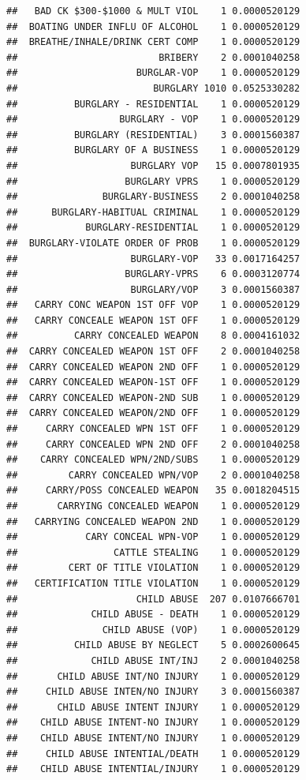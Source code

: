 \documentclass[]{book}
\begin{document}
\begin{verbatim}
##   BAD CK $300-$1000 & MULT VIOL    1 0.0000520129
##  BOATING UNDER INFLU OF ALCOHOL    1 0.0000520129
##  BREATHE/INHALE/DRINK CERT COMP    1 0.0000520129
##                         BRIBERY    2 0.0001040258
##                     BURGLAR-VOP    1 0.0000520129
##                        BURGLARY 1010 0.0525330282
##          BURGLARY - RESIDENTIAL    1 0.0000520129
##                  BURGLARY - VOP    1 0.0000520129
##          BURGLARY (RESIDENTIAL)    3 0.0001560387
##          BURGLARY OF A BUSINESS    1 0.0000520129
##                    BURGLARY VOP   15 0.0007801935
##                   BURGLARY VPRS    1 0.0000520129
##               BURGLARY-BUSINESS    2 0.0001040258
##      BURGLARY-HABITUAL CRIMINAL    1 0.0000520129
##            BURGLARY-RESIDENTIAL    1 0.0000520129
##  BURGLARY-VIOLATE ORDER OF PROB    1 0.0000520129
##                    BURGLARY-VOP   33 0.0017164257
##                   BURGLARY-VPRS    6 0.0003120774
##                    BURGLARY/VOP    3 0.0001560387
##   CARRY CONC WEAPON 1ST OFF VOP    1 0.0000520129
##   CARRY CONCEALE WEAPON 1ST OFF    1 0.0000520129
##          CARRY CONCEALED WEAPON    8 0.0004161032
##  CARRY CONCEALED WEAPON 1ST OFF    2 0.0001040258
##  CARRY CONCEALED WEAPON 2ND OFF    1 0.0000520129
##  CARRY CONCEALED WEAPON-1ST OFF    1 0.0000520129
##  CARRY CONCEALED WEAPON-2ND SUB    1 0.0000520129
##  CARRY CONCEALED WEAPON/2ND OFF    1 0.0000520129
##     CARRY CONCEALED WPN 1ST OFF    1 0.0000520129
##     CARRY CONCEALED WPN 2ND OFF    2 0.0001040258
##    CARRY CONCEALED WPN/2ND/SUBS    1 0.0000520129
##         CARRY CONCEALED WPN/VOP    2 0.0001040258
##     CARRY/POSS CONCEALED WEAPON   35 0.0018204515
##       CARRYING CONCEALED WEAPON    1 0.0000520129
##   CARRYING CONCEALED WEAPON 2ND    1 0.0000520129
##            CARY CONCEAL WPN-VOP    1 0.0000520129
##                 CATTLE STEALING    1 0.0000520129
##         CERT OF TITLE VIOLATION    1 0.0000520129
##   CERTIFICATION TITLE VIOLATION    1 0.0000520129
##                     CHILD ABUSE  207 0.0107666701
##             CHILD ABUSE - DEATH    1 0.0000520129
##               CHILD ABUSE (VOP)    1 0.0000520129
##          CHILD ABUSE BY NEGLECT    5 0.0002600645
##             CHILD ABUSE INT/INJ    2 0.0001040258
##       CHILD ABUSE INT/NO INJURY    1 0.0000520129
##     CHILD ABUSE INTEN/NO INJURY    3 0.0001560387
##       CHILD ABUSE INTENT INJURY    1 0.0000520129
##    CHILD ABUSE INTENT-NO INJURY    1 0.0000520129
##    CHILD ABUSE INTENT/NO INJURY    1 0.0000520129
##     CHILD ABUSE INTENTIAL/DEATH    1 0.0000520129
##    CHILD ABUSE INTENTIAL/INJURY    1 0.0000520129

\end{verbatim}
\end{document}
